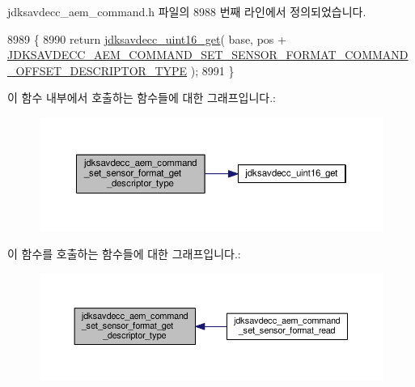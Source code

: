 jdksavdecc\+\_\+aem\+\_\+command.\+h 파일의 8988 번째 라인에서 정의되었습니다.


\begin{DoxyCode}
8989 \{
8990     \textcolor{keywordflow}{return} \hyperlink{group__endian_ga3fbbbc20be954aa61e039872965b0dc9}{jdksavdecc\_uint16\_get}( base, pos + 
      \hyperlink{group__command__set__sensor__format_gace515c24588c3ae825ba2d012e5b4257}{JDKSAVDECC\_AEM\_COMMAND\_SET\_SENSOR\_FORMAT\_COMMAND\_OFFSET\_DESCRIPTOR\_TYPE}
       );
8991 \}
\end{DoxyCode}


이 함수 내부에서 호출하는 함수들에 대한 그래프입니다.\+:
\nopagebreak
\begin{figure}[H]
\begin{center}
\leavevmode
\includegraphics[width=350pt]{group__command__set__sensor__format_ga089952a6ff57752fcd3a70920f76a816_cgraph}
\end{center}
\end{figure}




이 함수를 호출하는 함수들에 대한 그래프입니다.\+:
\nopagebreak
\begin{figure}[H]
\begin{center}
\leavevmode
\includegraphics[width=350pt]{group__command__set__sensor__format_ga089952a6ff57752fcd3a70920f76a816_icgraph}
\end{center}
\end{figure}


